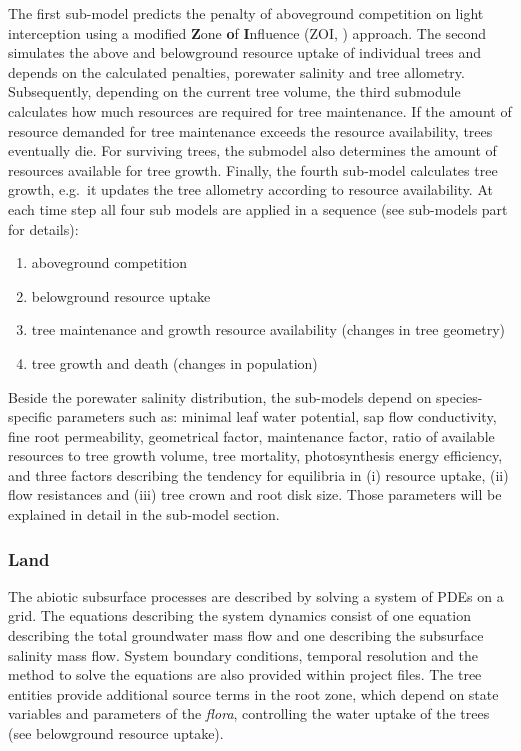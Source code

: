 \documentclass[manusscript, 12p, authoryear]{elsarticle}
\begin{document}
The first sub-model predicts the penalty of aboveground competition on light interception using a modified \textbf{Z}one \textbf{o}f \textbf{I}nfluence (ZOI, \citet{Berger2000}) approach.
The second simulates the above and belowground resource uptake of individual trees and depends on the calculated penalties, porewater salinity and tree allometry.
Subsequently, depending on the current tree volume, the third submodule calculates how much resources are required for tree maintenance.
If the amount of resource demanded for tree maintenance exceeds the resource availability, trees eventually die.
For surviving trees, the submodel also determines the amount of resources available for tree growth.
Finally, the fourth sub-model calculates tree growth, e.g.~it updates the tree allometry according to resource availability.
At each time step all four sub models are applied in a sequence (see sub-models part for details): 
\begin{enumerate}
\item aboveground competition
\item belowground resource uptake
\item tree maintenance and growth resource availability (changes in tree geometry)
\item tree growth and death (changes in population)
\end{enumerate}
Beside the porewater salinity distribution, the sub-models depend on species-specific parameters such as: minimal leaf water potential, sap flow conductivity, fine root permeability, geometrical factor, maintenance factor, ratio of available resources to tree growth volume, tree mortality, photosynthesis energy efficiency, and three factors describing the tendency for equilibria in (i) resource uptake, (ii) flow resistances and (iii) tree crown and root disk size.
Those parameters will be explained in detail in the sub-model section.
\subsubsection{Land}
The abiotic subsurface processes are described by solving a system of PDEs on a grid. The equations describing the system dynamics consist of one equation describing the total groundwater mass flow and one describing the subsurface salinity mass flow.
System boundary conditions, temporal resolution and the method to solve the equations are also provided within project files.
The tree entities provide additional source terms in the root zone, which depend on state variables and parameters of the \textit{flora}, controlling the water uptake of the trees (see belowground resource uptake).
\end{document}
